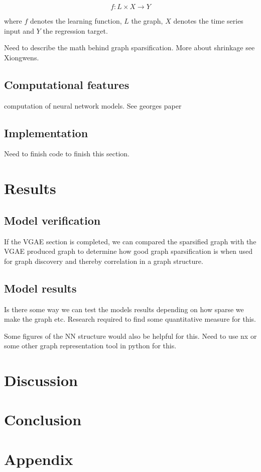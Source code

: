 \documentclass[honours,12pt]{unswthesis}
\numberwithin{equation}{section}
\begin{document}
\begin{equation}
f : L \times X \rightarrow Y
\end{equation}

\noindent where $f$ denotes the learning function, $L$ the graph, $X$ denotes the time series input and $Y$ the regression target.

Need to describe the math behind graph sparsification. More about shrinkage see Xiongwens.

{\section{Computational features}}\label{computation}
computation of neural network models. See georges paper 
{\section{Implementation}}\label{implementation}

Need to finish code to finish this section.

\chapter{Results}\label{results}

{\section{Model verification}}\label{model-verification}
If the VGAE section is completed, we can compared the sparsified graph with the VGAE
produced graph to determine how good graph sparsification is when used for graph discovery
and thereby correlation in a graph structure.

{\section{Model results}}\label{model-results}
Is there some way we can test the models results depending on how sparse we make the graph etc.
Research required to find some quantitative measure for this.

Some figures of the NN structure would also be helpful for this.
Need to use nx or some other graph representation tool in python for this.

\chapter{Discussion}\label{dis}

\chapter{Conclusion}\label{ccl}

\chapter{Appendix}\label{app}



\clearpage
{}
{}

\end{document}
